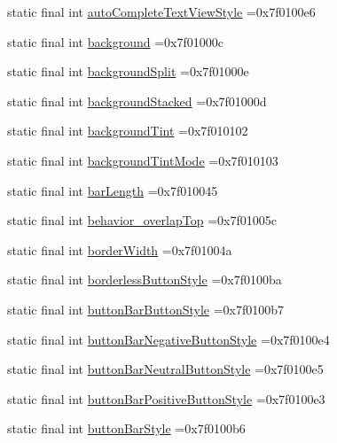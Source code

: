 \begin{DoxyCompactItemize}
\item 
static final int \hyperlink{classcheck_1_1test_1_1_r_1_1attr_a13adeb4de5114ee80c3d327c3cde8692}{auto\+Complete\+Text\+View\+Style} =0x7f0100e6
\item 
static final int \hyperlink{classcheck_1_1test_1_1_r_1_1attr_a5de53cfcc8516df6498e3a9365fccecb}{background} =0x7f01000c
\item 
static final int \hyperlink{classcheck_1_1test_1_1_r_1_1attr_ab1f7b7ff195fede33bbdf5e4010cb312}{background\+Split} =0x7f01000e
\item 
static final int \hyperlink{classcheck_1_1test_1_1_r_1_1attr_a003c234c1dbf40a537758be65695c08b}{background\+Stacked} =0x7f01000d
\item 
static final int \hyperlink{classcheck_1_1test_1_1_r_1_1attr_a9fef2f05f0fb4a8733f460d560d8ef0d}{background\+Tint} =0x7f010102
\item 
static final int \hyperlink{classcheck_1_1test_1_1_r_1_1attr_a30ef6484cfe3015f32395a912756a38f}{background\+Tint\+Mode} =0x7f010103
\item 
static final int \hyperlink{classcheck_1_1test_1_1_r_1_1attr_a8be14f238cbedd30588097110eb9dc82}{bar\+Length} =0x7f010045
\item 
static final int \hyperlink{classcheck_1_1test_1_1_r_1_1attr_a9be1079997ebc31c25e478abff5ec982}{behavior\+\_\+overlap\+Top} =0x7f01005c
\item 
static final int \hyperlink{classcheck_1_1test_1_1_r_1_1attr_a8707713c11a1157d48bae6aca2c70613}{border\+Width} =0x7f01004a
\item 
static final int \hyperlink{classcheck_1_1test_1_1_r_1_1attr_ab91a7f4468af245ddb54818cf62a7032}{borderless\+Button\+Style} =0x7f0100ba
\item 
static final int \hyperlink{classcheck_1_1test_1_1_r_1_1attr_a109ef78c6f65afeee8c7cc0206f19777}{button\+Bar\+Button\+Style} =0x7f0100b7
\item 
static final int \hyperlink{classcheck_1_1test_1_1_r_1_1attr_aa15b2310541c468ff8359b79c844bdb6}{button\+Bar\+Negative\+Button\+Style} =0x7f0100e4
\item 
static final int \hyperlink{classcheck_1_1test_1_1_r_1_1attr_a2dcc478f258562aa2b0462e764f8706c}{button\+Bar\+Neutral\+Button\+Style} =0x7f0100e5
\item 
static final int \hyperlink{classcheck_1_1test_1_1_r_1_1attr_a9c25c7766ad861d2e9abc49971df83c5}{button\+Bar\+Positive\+Button\+Style} =0x7f0100e3
\item 
static final int \hyperlink{classcheck_1_1test_1_1_r_1_1attr_a42d587c40efc746d3bdd3ce6c788d5a8}{button\+Bar\+Style} =0x7f0100b6

\end{DoxyCompactItemize}
